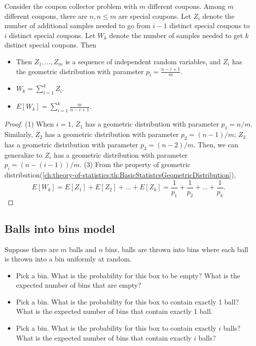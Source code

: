 \begin{refsection}
\begin{lemma}
	Consider the coupon collector problem with $m$ different coupons. Among $m$ different coupons, there are $n, n\leq m$ are special coupons. 	
	Let $Z_i$ denote the number of additional samples needed to go from $i-1$ distinct special coupons to $i$ distinct special coupons. Let $W_k$ denote the number of samples needed to get $k$ distinct special coupons. Then
	\begin{itemize}
		\item Then $Z_1,...,Z_m$ is a sequence of independent random variables, and $Z_i$ has the geometric distribution with parameter $p_i = \frac{n-i+1}{m}$.
		\item $W_k = \sum_{i=1}^{k}Z_i$.
		\item $E[W_k] = \sum_{i=1}^k \frac{m}{n-i+1}$.
	\end{itemize}
\end{lemma}
\begin{proof}
	(1) When $i=1$, $Z_1$ has a geometric distribution with parameter $p_1 = n/m$. Similarly, $Z_2$ has a geometric distribution with parameter $p_2 = (n-1)/m$; $Z_3$ has a geometric distribution with parameter $p_3 = (n-2)/m$. Then, we can generalize to $Z_i$ has a geometric distribution with parameter $p_i = (n-(i-1))/m$.
	(3) From the property of geometric distribution(\autoref{ch:theory-of-statistics:th:BasicStatistcsGeometricDistribution}),
	$$E[W_k] = E[Z_1] + E[Z_2] + ... + E[Z_k] = \frac{1}{p_1} + \frac{1}{p_2} + ... + \frac{1}{p_k}.$$
\end{proof}


\subsection{Balls into bins model}



\begin{definition}
Suppose there are $m$ balls and $n$ bins, balls are thrown into bins where each ball is thrown into a bin uniformly at random. 
\begin{itemize}
	\item Pick a bin. What is the probability for this box to be empty? What is the expected number of bins that are empty?
	\item Pick a bin. What is the probability for this box to contain exactly 1 ball? What is the expected number of bins that contain exactly 1 ball.
	\item Pick a bin. What is the probability for this box to contain exactly $i$ balls? What is the expected number of bins that contain exactly $i$ balls?
\end{itemize}
\end{definition}


\end{refsection}
